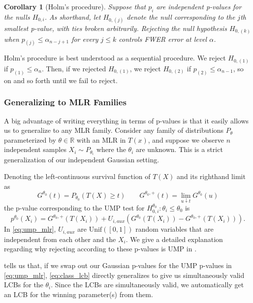 \documentclass{article}
\newtheorem{corollary}{Corollary}
\newcommand{\R}{\mathbb{R}}
\begin{document}
\begin{corollary}[Holm's procedure]
    \label{cor:sidak_closed}
    Suppose that $p_{i}$ are independent p-values for the nulls $H_{0, i}$. As shorthand, let $H_{0, (j)}$ denote the null corresponding to the $j$th smallest p-value, with ties broken arbitrarily. Rejecting the null hypothesis $H_{0, (k)}$ when $p_{(j)} \leq \alpha_{n - j + 1} $ for every $j \leq k$ controls FWER error at level $\alpha$. 
\end{corollary}

Holm's procedure is best understood as a sequential procedure. We reject $H_{0, (1)}$ if $p_{(1)} \leq \alpha_n$. Then, if we rejected $H_{0, (1)}$, we reject $H_{0, (2)}$ if $p_{(2)} \leq \alpha_{n-1}$, so on and so forth until we fail to reject.   

\subsubsection{Generalizing to MLR Families}
\label{sec:class_mlr}

A big advantage of writing everything in terms of p-values is that it easily allows us to generalize to any MLR family. Consider any family of distributions $P_{\theta}$ parameterized by $\theta \in \R$ with an MLR in $T(x)$, and suppose we observe $n$ independent samples $X_i \sim P_{\theta_i}$ where the $\theta_i$ are unknown. This is a strict generalization of our independent Gaussian setting. 

Denoting the left-continuous survival function of $T(X)$ and its righthand limit as 
\begin{equation*}
    G^{\theta_0}(t) = P_{\theta_0}(T(X) \geq t) \qquad G^{\theta_0, +}(t) = \lim_{u \downarrow t} G^{\theta_0}(u)
\end{equation*}
the p-value corresponding to the UMP test for $H^{\theta_0}_{0, i} : \theta_i \leq \theta_0$ is
\begin{equation}
    \label{eq:ump_mlr}
    p^{\theta_0}(X_i) = G^{\theta_0, +}(T(X_i)) + U_{i, aux}(G^{\theta_0}(T(X_i)) - G^{\theta_0, +}(T(X_i))). 
\end{equation}
In \eqref{eq:ump_mlr}, $U_{i, aux}$ are $\text{Unif}([0,1])$ random variables that are independent from each other and the $X_i$. We give a detailed explanation regarding why rejecting according to these p-values is UMP in . 

 tells us that, if we swap out our Gaussian p-values for the UMP p-values in \eqref{eq:ump_mlr}, \eqref{eq:class_lcb} directly generalizes to give us simultaneously valid LCBs for the $\theta_i$. Since the LCBs are simultaneously valid, we automatically get an LCB for the winning parameter(s) from them.  
\end{document}
